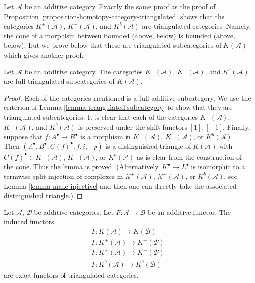 \begin{remark}
\label{remark-boundedness-conditions-triangulated}
Let $\mathcal{A}$ be an additive category.
Exactly the same proof as the proof of
Proposition \ref{proposition-homotopy-category-triangulated}
shows that the categories
$K^{+}(\mathcal{A})$, $K^{-}(\mathcal{A})$, and $K^b(\mathcal{A})$
are triangulated categories. Namely, the cone of a morphism between
bounded (above, below) is bounded (above, below).
But we prove below that these are triangulated subcategories
of $K(\mathcal{A})$ which gives another proof.
\end{remark}

\begin{lemma}
\label{lemma-bounded-triangulated-subcategories}
Let $\mathcal{A}$ be an additive category. The categories
$K^{+}(\mathcal{A})$, $K^{-}(\mathcal{A})$, and $K^b(\mathcal{A})$
are full triangulated subcategories of $K(\mathcal{A})$.
\end{lemma}

\begin{proof}
Each of the categories mentioned is a full additive subcategory.
We use the criterion of
Lemma \ref{lemma-triangulated-subcategory}
to show that they are triangulated subcategories.
It is clear that each of the categories
$K^{+}(\mathcal{A})$, $K^{-}(\mathcal{A})$, and $K^b(\mathcal{A})$
is preserved under the shift functors $[1], [-1]$.
Finally, suppose that $f : A^\bullet \to B^\bullet$ is a morphism
in $K^{+}(\mathcal{A})$, $K^{-}(\mathcal{A})$, or $K^b(\mathcal{A})$.
Then $(A^\bullet, B^\bullet, C(f)^\bullet, f, i, -p)$ is a distinguished
triangle of $K(\mathcal{A})$ with $C(f)^\bullet \in K^{+}(\mathcal{A})$,
$K^{-}(\mathcal{A})$, or $K^b(\mathcal{A})$ as is clear from the construction
of the cone. Thus the lemma is proved. (Alternatively,
$K^\bullet \to L^\bullet$ is isomorphic to a termwise split injection
of complexes in $K^{+}(\mathcal{A})$, $K^{-}(\mathcal{A})$, or
$K^b(\mathcal{A})$, see
Lemma \ref{lemma-make-injective}
and then one can directly take the associated
distinguished triangle.)
\end{proof}

\begin{lemma}
\label{lemma-additive-exact-homotopy-category}
Let $\mathcal{A}$, $\mathcal{B}$ be additive categories.
Let $F : \mathcal{A} \to \mathcal{B}$ be an additive functor.
The induced functors
$$
\begin{matrix}
F : K(\mathcal{A}) \longrightarrow K(\mathcal{B}) \\
F : K^{+}(\mathcal{A}) \longrightarrow K^{+}(\mathcal{B}) \\
F : K^{-}(\mathcal{A}) \longrightarrow K^{-}(\mathcal{B}) \\
F : K^b(\mathcal{A}) \longrightarrow K^b(\mathcal{B})
\end{matrix}
$$
are exact functors of triangulated categories.
\end{lemma}

